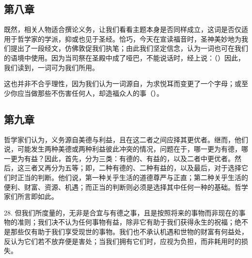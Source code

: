 
\subsection{第八章}

\par

既然，相关人物适合撰论义务，让我们看看主题本身是否同样成立，这词是否仅适用于哲学家的学派，抑或也见于圣经。恰巧，今天在宣读福音时，圣神美妙地为我们提出了一段经文，仿佛敦促我们执笔；由此我们坚定信念，认为一词也可在我们的语境中使用。因为当司祭在圣殿中成了哑巴，不能说话时，经上说：（）因此，我们读到，一词可为我们所用。\par

这也并非不合乎理性，因为我们认为一词源自，为求悦耳而变更了一个字母；或至少你应当做那些不伤害任何人，却造福众人的事（）。\par


\subsection{第九章}

\par

哲学家们认为，义务源自美德与利益，且在这二者之间应择其更优者。继而，他们说，可能发生两种美德或两种利益彼此冲突的情况，问题在于，哪一更为有德，哪一更为有益？因此，首先，分为三类：有德的、有益的，以及二者中更优者。然后，这三者又再分为五等；即，二种有德的、二种有益的，以及最后，对于选择它们时正当的判断。他们说，第一种关乎生活的道德尊严与正直；第二种关乎生活的便利、财富、资源、机遇；而正当的判断则必须是选择其中任何一种的基础。哲学家们所言即如此。\par

28. 但我们所度量的，无非是合宜与有德之事，且是按照将来的事物而非现在的事物的准则；我们决不认为任何事物有益，除非它有助于我们获得永生的祝福；绝不是那些仅有助于我们享受现世的事物。我们也不承认机遇和世物的财富有何益处，反认为它们若不放弃便是害处；当我们拥有它们时，应视为负担，而非耗用时的损失。\par

